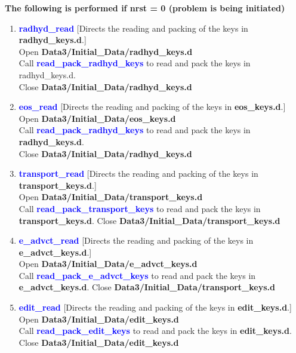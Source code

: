 \documentclass[11pt,doublespace]{article}
\begin{document}
\begin{itemize}
\begin{enumerate}
\begin{enumerate}
{\begin{enumerate}
  {\bf The following is performed if nrst = 0 (problem is being initiated)} \\

\begin{enumerate}

  \item \textcolor{blue}{ {\bf radhyd\_read} }
  [Directs the reading and packing of the keys in {\bf radhyd\_keys.d}.]\\
  Open {\bf Data3/Initial\_Data/radhyd\_keys.d}\\
  Call \textcolor{blue}{ {\bf read\_pack\_radhyd\_keys} } to read and pack the keys  in {radhyd\_keys.d}.\\
  Close {\bf Data3/Initial\_Data/radhyd\_keys.d}

  \item \textcolor{blue}{ {\bf eos\_read} }
  [Directs the reading and packing of the keys in {\bf eos\_keys.d}.]\\
  Open {\bf Data3/Initial\_Data/eos\_keys.d}\\
  Call \textcolor{blue}{ {\bf read\_pack\_radhyd\_keys} } to read and pack the keys  in {\bf radhyd\_keys.d}.\\
  Close {\bf Data3/Initial\_Data/radhyd\_keys.d}

  \item \textcolor{blue}{ {\bf transport\_read} }
  [Directs the reading and packing of the keys in {\bf transport\_keys.d}.]\\
  Open {\bf Data3/Initial\_Data/transport\_keys.d}\\
  Call \textcolor{blue}{ {\bf read\_pack\_transport\_keys} } to read and pack the keys  in {\bf transport\_keys.d}.
  Close {\bf Data3/Initial\_Data/transport\_keys.d}

  \item \textcolor{blue}{ {\bf e\_advct\_read} }
  [Directs the reading and packing of the keys in {\bf e\_advct\_keys.d}.]\\
  Open {\bf Data3/Initial\_Data/e\_advct\_keys.d}\\
  Call \textcolor{blue}{ {\bf read\_pack\_e\_advct\_keys} } to read and pack the keys  in {\bf e\_advct\_keys.d}.
  Close {\bf Data3/Initial\_Data/transport\_keys.d}

  \item \textcolor{blue}{ {\bf edit\_read} }
  [Directs the reading and packing of the keys in {\bf edit\_keys.d}.]\\
  Open {\bf Data3/Initial\_Data/edit\_keys.d}\\
  Call \textcolor{blue}{ {\bf read\_pack\_edit\_keys} } to read and pack the keys  in {\bf edit\_keys.d}.\\
  Close {\bf Data3/Initial\_Data/edit\_keys.d}


\end{enumerate}
\end{enumerate}}
\end{enumerate}
\end{enumerate}
\end{itemize}
\end{document}

